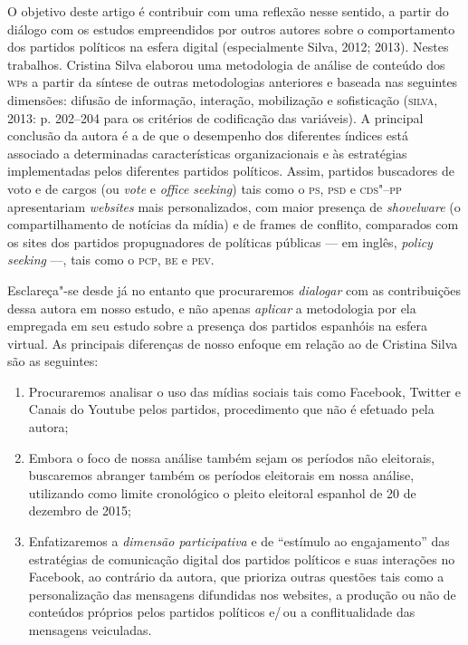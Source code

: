 O objetivo deste artigo é contribuir com uma reflexão nesse sentido, a
partir do diálogo com os estudos empreendidos por outros autores sobre o
comportamento dos partidos políticos na esfera digital (especialmente
Silva, 2012; 2013). Nestes trabalhos. Cristina Silva elaborou uma
metodologia de análise de conteúdo dos \textsc{wp}s a partir da síntese de outras
metodologias anteriores e baseada nas seguintes dimensões: difusão de
informação, interação, mobilização e sofisticação (\textsc{silva}, 2013: p.
202--204 para os critérios de codificação das variáveis). A principal
conclusão da autora é a de que o desempenho dos diferentes índices está
associado a determinadas características organizacionais e às
estratégias implementadas pelos diferentes partidos políticos. Assim,
partidos buscadores de voto e de cargos (ou \textit{vote} e \textit{office seeking}) tais
como o \textsc{ps}, \textsc{psd} e \textsc{cds"--pp} apresentariam \textit{websites} mais personalizados, com
maior presença de \textit{shovelware} (o compartilhamento de notícias da mídia) e
de frames de conflito, comparados com os sites dos partidos
propugnadores de políticas públicas --- em inglês, \textit{policy seeking} ---, tais como o \textsc{pcp},
\textsc{be} e \textsc{pev}.

Esclareça"-se desde já no entanto que procuraremos \textit{dialogar} com as
contribuições dessa autora em nosso estudo, e não apenas \textit{aplicar}
a metodologia por ela empregada em seu estudo sobre a presença dos
partidos espanhóis na esfera virtual. As principais diferenças de nosso
enfoque em relação ao de Cristina Silva são as seguintes: 

\begin{enumerate}
\item Procuraremos analisar o uso das mídias sociais tais como Facebook,
Twitter e Canais do Youtube pelos partidos, procedimento que não é
efetuado pela autora; 

\item Embora o foco de nossa análise também sejam
os períodos não eleitorais, buscaremos abranger também os períodos
eleitorais em nossa análise, utilizando como limite cronológico o pleito
eleitoral espanhol de 20 de dezembro de 2015; 

\item Enfatizaremos a \textit{dimensão participativa} e de ``estímulo ao engajamento'' das estratégias de comunicação digital dos partidos políticos e suas interações no Facebook, ao contrário da autora, que prioriza outras questões tais como a personalização das mensagens difundidas nos websites, a produção ou não de conteúdos próprios pelos partidos políticos e/\,ou a conflitualidade das mensagens veiculadas.
\end{enumerate}

